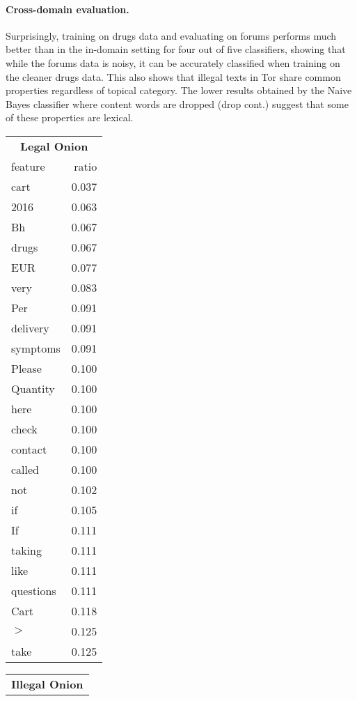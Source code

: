 \documentclass[11pt,a4paper,table]{article}
\begin{document}
\paragraph{Cross-domain evaluation.}

Surprisingly, training on drugs data and evaluating on forums performs much
better than %
in the in-domain setting
for four out of five classifiers,
showing that while the forums data is noisy, it can be accurately classified
when training on the cleaner drugs data. This also shows that illegal texts in Tor share common properties regardless of topical category.
The lower results obtained by the Naive Bayes classifier where content words are dropped (drop cont.) suggest that some of
these properties are lexical.

\begin{table}[t]
\small
\begin{tabular}{lr}
\multicolumn{2}{c}{\textbf{Legal Onion}}\\
feature & ratio\\
\hline
cart & 0.037\\
2016 & 0.063\\
Bh & 0.067\\
drugs & 0.067\\
EUR & 0.077\\
very & 0.083\\
Per & 0.091\\
delivery & 0.091\\
symptoms & 0.091\\
Please & 0.100\\
Quantity & 0.100\\
here & 0.100\\
check & 0.100\\
contact & 0.100\\
called & 0.100\\
not & 0.102\\
if & 0.105\\
If & 0.111\\
taking & 0.111\\
like & 0.111\\
questions & 0.111\\
Cart & 0.118\\
$>$ & 0.125\\
take & 0.125\\
\end{tabular}
\begin{tabular}{lr}
\multicolumn{2}{c}{\textbf{Illegal Onion}}\\

\end{tabular}
\end{table}
\end{document}
